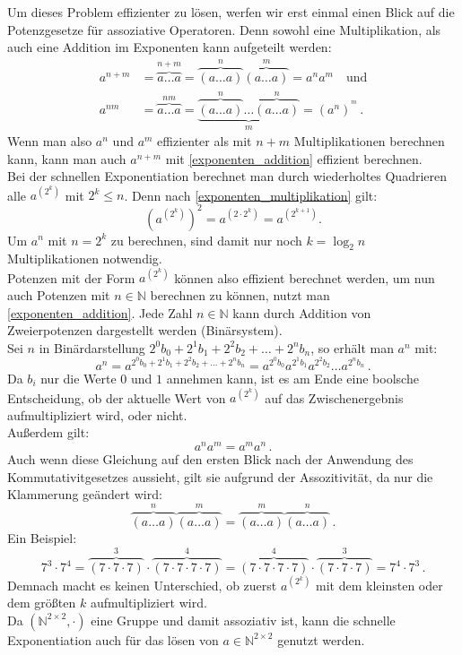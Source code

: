 \documentclass[course=erap]{aspdoc}
\begin{document}
Um dieses Problem effizienter zu lösen, werfen wir erst einmal einen Blick auf die Potenzgesetze für assoziative Operatoren. Denn sowohl eine Multiplikation, als auch eine Addition im Exponenten kann aufgeteilt werden:
\begin{align}
  a^{n+m} &= \overbrace{a\dots a}^{n+m} = \overbrace{(a\dots a)}^n \overbrace{(a\dots a)}^m = a^n a^m \quad \text{und} \label{exponenten_addition} \\
  a^{nm} &= \overbrace{a\dots a}^{nm} = \underbrace{\overbrace{(a \dots a)}^n \dots \overbrace{(a \dots a)}^n}_m = (a^n)^{^m} \, . \label{exponenten_multiplikation}
\end{align}
Wenn man also $a^n$ und $a^m$ effizienter als mit $n+m$ Multiplikationen berechnen kann, kann man auch $a^{n+m}$ mit \ref{exponenten_addition} effizient berechnen.\\
Bei der schnellen Exponentiation berechnet man durch wiederholtes Quadrieren alle $a^{(2^k)}$ mit $2^k \le n$. Denn nach \ref{exponenten_multiplikation} gilt:
\[ {\left( a^{(2^k)} \right)}^2 = a^{(2 \cdot 2^k)} = a^{(2^{k+1})}.\]
Um $a^n$ mit $n=2^k$ zu berechnen, sind damit nur noch $k=\log_2n$ Multiplikationen notwendig.
\\Potenzen mit der Form $a^{(2^k)}$ können also effizient berechnet werden, um nun auch Potenzen mit $n\in\mathbb{N}$ berechnen zu können, nutzt man \ref{exponenten_addition}. 
Jede Zahl $n\in\mathbb{N}$ kann durch Addition von Zweierpotenzen dargestellt werden (Binärsystem). \\
Sei $n$ in Binärdarstellung $2^0b_0+2^1b_1+2^2b_2+\dots+2^nb_n$, so erhält man $a^n$ mit:
\[ a^n = a^{2^0b_0+2^1b_1+2^2b_2+\dots+2^nb_n} = a^{2^0b_0} a^{2^1b_1} a^{2^2b_2} \dots a^{2^nb_n} \, .\]
Da $b_i$ nur die Werte $0$ und $1$ annehmen kann, ist es am Ende eine boolsche Entscheidung, ob der aktuelle Wert von $a^{(2^k)}$ auf das Zwischenergebnis aufmultipliziert wird, oder nicht.\\
Außerdem gilt:
\begin{equation}\label{swap_exponents}
      a^n a^m = a^m a^n \, .
\end{equation}
Auch wenn diese Gleichung auf den ersten Blick nach der Anwendung des Kommutativitgesetzes aussieht, gilt sie aufgrund der Assozitivität, da nur die Klammerung geändert wird:
\[ \overbrace{(a\dots a)}^n \overbrace{(a \dots a)}^m = \overbrace{(a \dots a)}^m \overbrace{(a \dots a)}^n \, .\]
Ein Beispiel:
\[ 7^3\cdot7^4 = \overbrace{(7\cdot7\cdot7)}^3\cdot\overbrace{(7\cdot7\cdot7\cdot7)}^4 = \overbrace{(7\cdot7\cdot7\cdot7)}^4\cdot\overbrace{(7\cdot7\cdot7)}^3 = 7^4 \cdot 7^3 \, . \]
Demnach macht es keinen Unterschied, ob zuerst $a^{(2^k)}$ mit dem kleinsten oder dem größten $k$ aufmultipliziert wird.\\
Da $(\mathbb{N}^{2\times 2}, \cdot)$ eine Gruppe und damit assoziativ ist, kann die schnelle Exponentiation auch für das lösen von $a\in\mathbb{N}^{2\times 2}$ genutzt werden.
\end{document}
